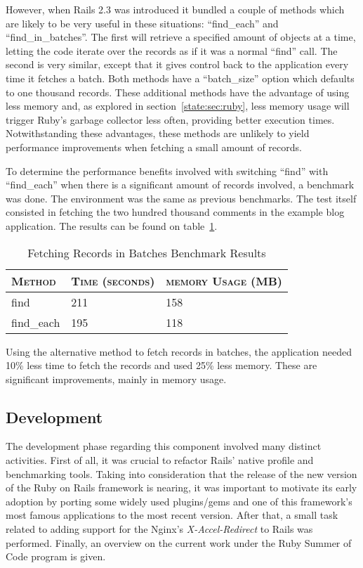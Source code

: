 However, when Rails 2.3 was introduced it bundled a couple of methods which are likely to be very useful in these situations: ``find\_each'' and ``find\_in\_batches''. The first will retrieve a specified amount of objects at a time, letting the code iterate over the records as if it was a normal ``find'' call. The second is very similar, except that it gives control back to the application every time it fetches a batch. Both methods have a ``batch\_size'' option which defaults to one thousand records. These additional methods have the advantage of using less memory and, as explored in section~\ref{state:sec:ruby}, less memory usage will trigger Ruby's garbage collector less often, providing better execution times. Notwithstanding these advantages, these methods are unlikely to yield performance improvements when fetching a small amount of records.

To determine the performance benefits involved with switching ``find'' with ``find\_each'' when there is a significant amount of records involved, a benchmark was done. The environment was the same as previous benchmarks. The test itself consisted in fetching the two hundred thousand comments in the example blog application. The results can be found on table~\ref{tab:fetch_in_batches}.
\begin{table}[ht]
  \centering
  
  \begin{tabular}{l|l|l}
    \textsc{Method}
  & \textsc{Time (seconds)}
  & \textsc{memory Usage (MB)} \\
  \hline
  find & 211 & 158 \\
  find\_each & 195 & 118 \\
  
  \end{tabular}
  \caption{Fetching Records in Batches Benchmark Results}
  \label{tab:fetch_in_batches}
\end{table}
Using the alternative method to fetch records in batches, the application needed 10\% less time to fetch the records and used 25\% less memory. These are significant improvements, mainly in memory usage.

\subsection{Development}
The development phase regarding this component involved many distinct activities. First of all, it was crucial to refactor Rails' native profile and benchmarking tools. Taking into consideration that the release of the new version of the Ruby on Rails framework is nearing, it was important to motivate its early adoption by porting some widely used plugins/gems and one of this framework's most famous applications to the most recent version. After that, a small task related to adding support for the Nginx's \textit{X-Accel-Redirect} to Rails was performed. Finally, an overview on the current work under the Ruby Summer of Code program is given.

